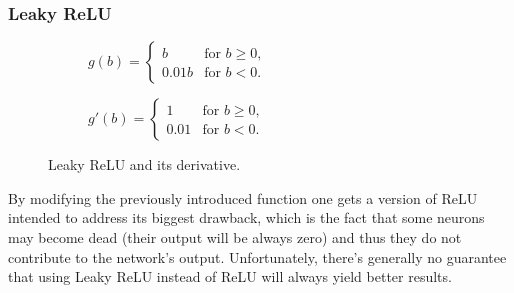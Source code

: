 \subsubsection{Leaky ReLU}
\vspace{3mm}
\begin{figure}[h]  
	\centering 
	\begin{subfigure}[b]{0.4\linewidth}
		\caption{$ g(b)= 
			\begin{cases}	
			b & \text{for $b \geq 0$,}\\
			0.01b & \text{for $b < 0$.}
			\end{cases}  $}    
	\end{subfigure}
	\begin{subfigure}[b]{0.4\linewidth}
		\caption{$ g'(b)= 
			\begin{cases}	
			1 & \text{for $b \geq 0$,}\\
			0.01 & \text{for $b < 0$.}
			\end{cases}  $}  
	\end{subfigure}
	\vspace{10mm}
	\caption{Leaky ReLU and its derivative.}
\end{figure}

By modifying the previously introduced function one gets a version of ReLU intended to address its biggest drawback, which is the fact that some neurons may become dead (their output will be always zero) and thus they do not contribute to the network's output. Unfortunately, there's generally no guarantee that using Leaky ReLU instead of ReLU will always yield better results. \cite{stanford-L4}

